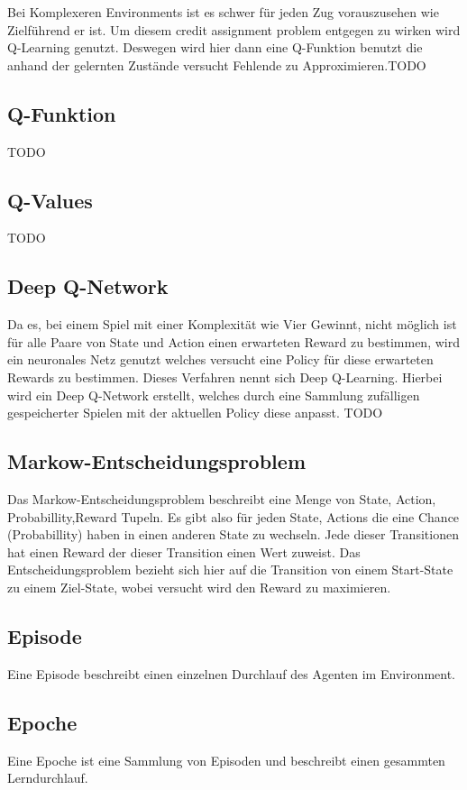 Bei Komplexeren Environments ist es schwer für jeden Zug vorauszusehen wie Zielführend er ist. Um diesem credit assignment problem entgegen zu wirken wird Q-Learning genutzt.
Deswegen wird hier dann eine Q-Funktion benutzt die anhand der gelernten Zustände versucht Fehlende zu Approximieren.\colorbox{red!30}{TODO}

\subsection{Q-Funktion}
\colorbox{red!30}{TODO} %

\subsection{Q-Values}
\colorbox{red!30}{TODO} %

\subsection{Deep Q-Network}
Da es, bei einem Spiel mit einer Komplexität wie Vier Gewinnt, nicht möglich ist für alle Paare von State und Action einen erwarteten Reward zu bestimmen, wird ein neuronales Netz genutzt welches versucht eine Policy für diese erwarteten Rewards zu bestimmen. Dieses Verfahren nennt sich Deep Q-Learning. Hierbei wird ein Deep Q-Network erstellt, welches durch eine Sammlung zufälligen gespeicherter Spielen mit der aktuellen Policy diese anpasst.
\colorbox{red!30}{TODO} %

\subsection{Markow-Entscheidungsproblem}
Das Markow-Entscheidungsproblem beschreibt eine Menge von State, Action, Probabillity,Reward Tupeln. Es gibt also für jeden State, Actions die eine Chance (Probabillity) haben in einen anderen State zu wechseln. Jede dieser Transitionen hat einen Reward der dieser Transition einen Wert zuweist. Das Entscheidungsproblem bezieht sich hier auf die Transition von einem Start-State zu einem Ziel-State, wobei versucht wird den Reward zu maximieren.

\subsection{Episode}
Eine Episode beschreibt einen einzelnen Durchlauf des Agenten im Environment.

\subsection{Epoche}
Eine Epoche ist eine Sammlung von Episoden und beschreibt einen gesammten Lerndurchlauf.


